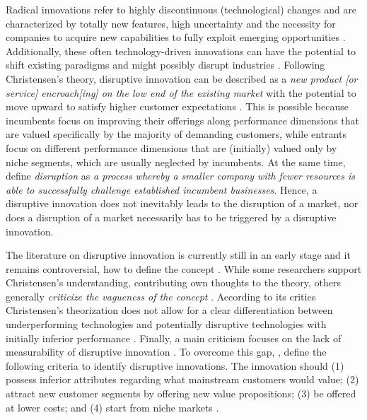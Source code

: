 Radical innovations refer to highly discontinuous (technological) changes \parencite{Latzer01062009} and are characterized by totally new features, high uncertainty and the necessity 
for companies to acquire new capabilities to fully exploit emerging opportunities 
\parencite{Latzer01062009}. Additionally, these often technology-driven innovations can have 
the potential to shift existing paradigms and might possibly disrupt industries 
\parencite{Latzer01062009}. Following Christensen's theory, disruptive innovation can be described 
as a \emph{new product [or service] encroach[ing] on the low end of the existing market} 
\parencite[][348]{JPIM:JPIM306} with the potential to move upward to satisfy 
higher customer expectations \parencite{clayton1997innovator,ISI:000234127700008}. This is possible because 
incumbents focus on improving their offerings along performance dimensions that 
are valued specifically by the majority of demanding customers, while entrants 
focus on different performance dimensions that are (initially) valued only by niche 
segments, which are usually neglected by incumbents. At the same time, \cite{christensen2015disruptive} define \emph{disruption} as \emph{a process whereby a smaller company with 
fewer resources is able to successfully challenge established incumbent businesses}. 
Hence, a disruptive innovation does not inevitably leads to the disruption of a 
market, nor does a disruption of a market necessarily has to be triggered by a 
disruptive innovation. 

The literature on disruptive innovation is currently still in an early stage \parencite{JPIM:JPIM177} and it remains controversial, how to define the concept \parencite{ISI:000283729100005}. While some researchers support Christensen's understanding, 
contributing own thoughts to the theory, others generally \emph{criticize the vagueness 
of the concept} \parencite[][438]{ISI:000283729100005}. According to its critics Christensen's 
theorization does not allow for a clear differentiation between underperforming 
technologies and potentially disruptive technologies with initially inferior performance 
\parencite{JPIM:JPIM179}. Finally, a main criticism focuses on the lack of measurability of 
disruptive innovation \parencite{JPIM:JPIM176}. To overcome this gap, \parencite{JPIM:JPIM176}, define the following criteria to identify disruptive innovations. 
The innovation should (1) possess inferior attributes regarding what mainstream 
customers would value; (2) attract new customer segments by offering new value 
propositions; (3) be offered at lower costs; and (4) start from niche markets \parencite{ISI:000283729100005,JPIM:JPIM176}.

